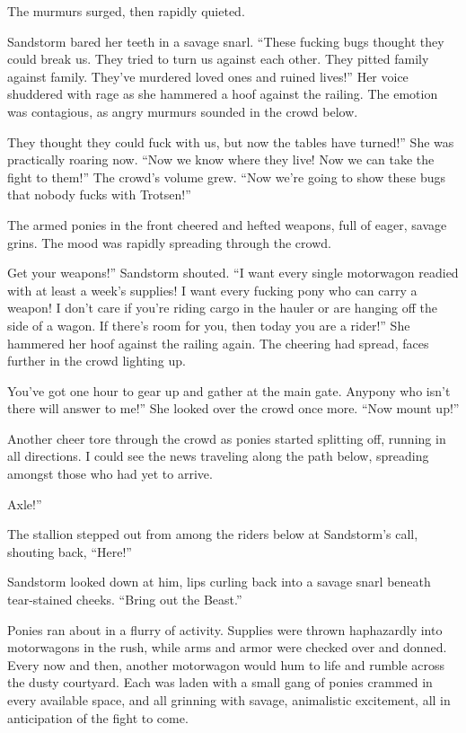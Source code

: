 The murmurs surged, then rapidly quieted.

Sandstorm bared her teeth in a savage snarl. “These fucking bugs thought they could break us. They tried to turn us against each other. They pitted family against family. They’ve murdered loved ones and ruined lives!” Her voice shuddered with rage as she hammered a hoof against the railing. The emotion was contagious, as angry murmurs sounded in the crowd below.

\leavevmode{}They thought they could fuck with us, but now the tables have turned!” She was practically roaring now. “Now we know where they live! Now we can take the fight to them!” The crowd’s volume grew. “Now we’re going to show these bugs that nobody fucks with Trotsen!”

The armed ponies in the front cheered and hefted weapons, full of eager, savage grins. The mood was rapidly spreading through the crowd.

\leavevmode{}Get your weapons!” Sandstorm shouted. “I want every single motorwagon readied with at least a week’s supplies! I want every fucking pony who can carry a weapon! I don’t care if you’re riding cargo in the hauler or are hanging off the side of a wagon. If there’s room for you, then today you are a rider!” She hammered her hoof against the railing again. The cheering had spread, faces further in the crowd lighting up.

\leavevmode{}You’ve got one hour to gear up and gather at the main gate. Anypony who isn’t there will answer to me!” She looked over the crowd once more. “Now mount up!”

Another cheer tore through the crowd as ponies started splitting off, running in all directions. I could see the news traveling along the path below, spreading amongst those who had yet to arrive.

\leavevmode{}Axle!”

The stallion stepped out from among the riders below at Sandstorm’s call, shouting back, “Here!”

Sandstorm looked down at him, lips curling back into a savage snarl beneath tear-stained cheeks. “Bring out the Beast.”

{\br}%
Ponies ran about in a flurry of activity. Supplies were thrown haphazardly into motorwagons in the rush, while arms and armor were checked over and donned. Every now and then, another motorwagon would hum to life and rumble across the dusty courtyard. Each was laden with a small gang of ponies crammed in every available space, and all grinning with savage, animalistic excitement, all in anticipation of the fight to come.

